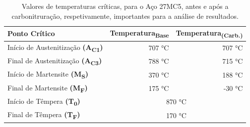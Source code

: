 \begin{table}[htb]
    \centering
    \caption[Valores de temperatura importantes para a análise de resultados]%
    {Valores de temperaturas críticas, para o Aço 27MC5, antes e após a carbonitruração, respetivamente, importantes para a análise de resultados.}
    \label{tab:temp_sim}
    \begin{tabular}{lrr} 
    \toprule
    \textbf{Ponto Crítico}                  & \multicolumn{1}{c}{\textbf{Temperatura\textsubscript{Base}}} & \multicolumn{1}{c}{\textbf{Temperatura\textsubscript{(Carb.)}}}  \\ 
    \hline\hline
    Início de Austenitização \textbf{(A\textsubscript{C1})} & 707 °C                                            & 707 °C                                               \\
    Final de Austenitização \textbf{(A\textsubscript{C3})}  & 788 °C                                            & 715 °C                                               \\
    Início de Martensite \textbf{(M\textsubscript{S})}      & 370 °C                                            & 188 °C                                               \\
    Final de Martensite \textbf{(M\textsubscript{F})}       & 175 °C                                            & -30 °C                                               \\
    \hline
    Início de Têmpera \textbf{(T\textsubscript{0})}         & \multicolumn{2}{c}{870 °C}                                                                                \\
    Final de Têmpera \textbf{(T\textsubscript{F})}          & \multicolumn{2}{c}{170 °C}                                                                                \\
    \bottomrule
    \end{tabular}
    \end{table}
\newpage
